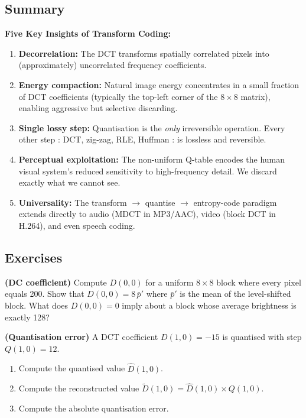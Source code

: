 \subsection{Summary}

\begin{importantbox}
\textbf{Five Key Insights of Transform Coding:}
\begin{enumerate}[nosep]
  \item \textbf{Decorrelation:} The DCT transforms spatially correlated pixels into (approximately) uncorrelated frequency coefficients.
  \item \textbf{Energy compaction:} Natural image energy concentrates in a small fraction of DCT coefficients (typically the top-left corner of the $8\times8$ matrix), enabling aggressive but selective discarding.
  \item \textbf{Single lossy step:} Quantisation is the \emph{only} irreversible operation. Every other step : DCT, zig-zag, RLE, Huffman : is lossless and reversible.
  \item \textbf{Perceptual exploitation:} The non-uniform Q-table encodes the human visual system's reduced sensitivity to high-frequency detail. We discard exactly what we cannot see.
  \item \textbf{Universality:} The transform $\to$ quantise $\to$ entropy-code paradigm extends directly to audio (MDCT in MP3/AAC), video (block DCT in H.264), and even speech coding.
\end{enumerate}
\end{importantbox}

\subsection{Exercises}

\begin{exercisebox}
\textbf{(DC coefficient)} Compute $D(0,0)$ for a uniform $8\times8$ block where every pixel equals 200. Show that $D(0,0) = 8\,\bar{p}'$ where $\bar{p}'$ is the mean of the level-shifted block. What does $D(0,0)=0$ imply about a block whose average brightness is exactly 128?
\end{exercisebox}

\begin{exercisebox}
\textbf{(Quantisation error)} A DCT coefficient $D(1,0)=-15$ is quantised with step $Q(1,0)=12$.
\begin{enumerate}[nosep, label=(\alph*)]
  \item Compute the quantised value $\hat{D}(1,0)$.
  \item Compute the reconstructed value $\tilde{D}(1,0) = \hat{D}(1,0)\times Q(1,0)$.
  \item Compute the absolute quantisation error.
\end{enumerate}
\end{exercisebox}

